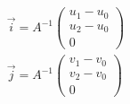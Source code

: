 \documentclass{article}
\begin{document}
\thispagestyle{empty}

$$
\begin{array}{ll}
\vec{i} = A^{-1} \begin{pmatrix}u_1-u_0 \\u_2-u_0 \\0\end{pmatrix}\\
\vec{j} = A^{-1} \begin{pmatrix}v_1-v_0 \\v_2-v_0 \\0\end{pmatrix}
\end{array}
$$
\end{document}
